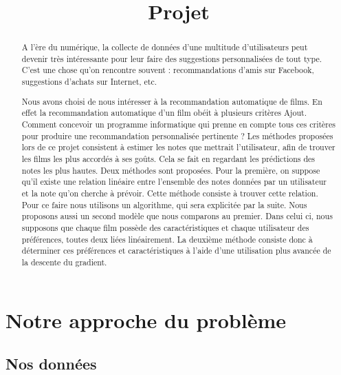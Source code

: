 \documentclass[a4paper,10pt]{article}
\title{Projet}
\author{}
\begin{document}
\maketitle

\begin{abstract}
A l’ère du numérique, la collecte de données d’une multitude d’utilisateurs peut devenir très intéressante pour leur faire des suggestions personnalisées de tout type. C’est une chose qu’on rencontre souvent : recommandations d’amis sur Facebook, suggestions d’achats sur Internet, etc.

Nous avons choisi de nous intéresser à la recommandation automatique de films. En effet la recommandation automatique d’un film obéit à plusieurs critères Ajout. Comment concevoir un programme informatique qui prenne en compte tous ces critères pour produire une recommandation personnalisée pertinente ?
Les méthodes proposées lors de ce projet consistent à estimer les notes que mettrait l’utilisateur, afin de trouver les films les plus accordés à ses goûts. Cela se fait en regardant les prédictions des notes les plus hautes. Deux méthodes sont proposées. Pour la première, on suppose qu’il existe une relation linéaire entre l’ensemble des notes données par un utilisateur et la note qu’on cherche à prévoir. Cette méthode consiste à trouver cette relation. Pour ce faire nous utilisons un algorithme, qui sera explicitée par la suite. Nous proposons aussi un second modèle que nous comparons au premier. Dans celui ci, nous supposons que chaque film possède des caractéristiques et chaque utilisateur des préférences, toutes deux liées linéairement. La deuxième méthode consiste donc à déterminer ces préférences et caractéristiques à l’aide d’une utilisation plus avancée de la descente du gradient.
\end{abstract}
\section{Notre approche du problème}
\subsection{Nos données}
\end{document}
